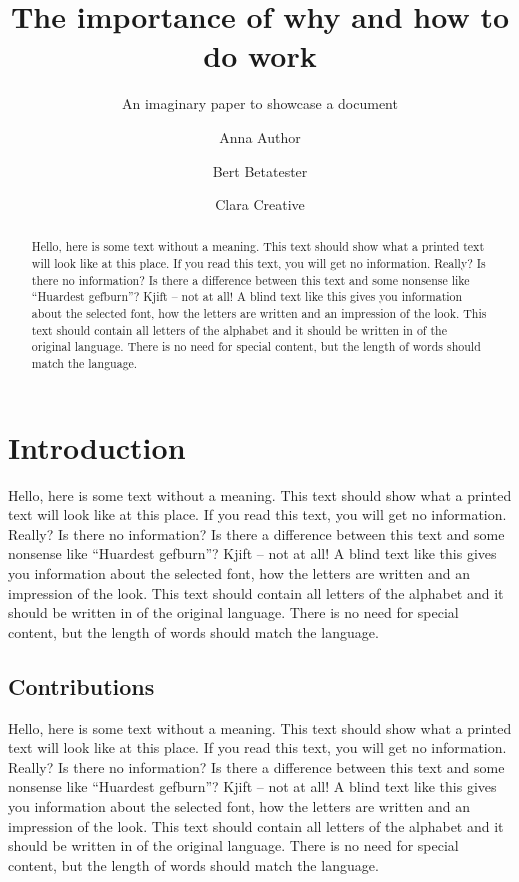\documentclass[%
  english,%
  todotools=true,%
  trtype=singlearticle%
]{hpitr}
\begin{document}
\title{The importance of why and how to do work}
\subtitle{An imaginary paper to showcase a document}
\author{Anna Author\and Bert Betatester\and Clara Creative}
\maketitle

\begin{abstract}
  Hello, here is some text without a meaning. This text should show
  what a printed text will look like at this place. If you read this
  text, you will get no information. Really? Is there no
  information? Is there a difference between this text and some
  nonsense like “Huardest gefburn”? Kjift – not at all! A blind text
  like this gives you information about the selected font, how the
  letters are written and an impression of the look. This text
  should contain all letters of the alphabet and it should be
  written in of the original language. There is no need for special
  content, but the length of words should match the language.
\end{abstract}


\section{Introduction}
\label{sec:introduction}

Hello, here is some text without a meaning. This text should show
what a printed text will look like at this place. If you read this
text, you will get no information. Really? Is there no information?
Is there a difference between this text and some nonsense like
“Huardest gefburn”? Kjift – not at all! A blind text like this gives
you information about the selected font, how the letters are written
and an impression of the look. This text should contain all letters
of the alphabet and it should be written in of the original
language. There is no need for special content, but the length of
words should match the language.

\subsection{Contributions}
\label{sec:contributions}

Hello, here is some text without a meaning. This text should show
what a printed text will look like at this place. If you read this
text, you will get no information. Really? Is there no information?
Is there a difference between this text and some nonsense like
“Huardest gefburn”? Kjift – not at all! A blind text like this gives
you information about the selected font, how the letters are written
and an impression of the look. This text should contain all letters
of the alphabet and it should be written in of the original
language. There is no need for special content, but the length of
words should match the language.
\end{document}
